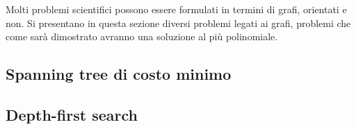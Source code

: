 \documentclass{subfiles}
\begin{document}
Molti problemi scientifici possono essere formulati in termini di grafi, orientati e non.
Si presentano in questa sezione diversi problemi legati ai grafi, problemi che come sarà dimostrato avranno una soluzione al più polinomiale.

\subsection{Spanning tree di costo minimo}

\clearpage

\subsection{Depth-first search}
%
\end{document}
